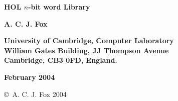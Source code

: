 
\begin{titlepage}

\setcounter{page}{1}		          %


\mbox{}
\vskip20mm
\begin{center}
{\Huge\bf HOL $n$-bit word Library}
\end{center}


\vskip15mm
\begin{center}
\large\bf A. C. J. Fox
\end{center}


\vfill
\begin{center}
\bf
University of Cambridge, Computer Laboratory\\
William Gates Building, JJ Thompson Avenue\\
Cambridge, {\small\bf CB}3 0{\small\bf FD}, England.
\end{center}


\vskip5mm
\begin{center}
\bf February 2004
\end{center}

\end{titlepage}

\thispagestyle{empty}
\mbox{}

\vfill
\begin{center}
\copyright\ A. C. J. Fox 2004
\end{center}
\newpage

